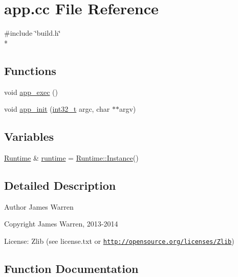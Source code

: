 \section{app.\-cc File Reference}
\label{app_8cc}
{\ttfamily \#include \char`\"{}build.\-h\char`\"{}}\\*
\subsection*{Functions}
\begin{DoxyCompactItemize}
\item 
void \hyperlink{app_8cc_a6259e72a343cd6012e8ceb017bac8556}{app\-\_\-exec} ()
\item 
void \hyperlink{app_8cc_a7ab0624f9c8aeab843f91432c75638ee}{app\-\_\-init} (\hyperlink{stdint_8h_a32f2e37ee053cf2ce8ca28d1f74630e5}{int32\-\_\-t} argc, char $\ast$$\ast$argv)
\end{DoxyCompactItemize}
\subsection*{Variables}
\begin{DoxyCompactItemize}
\item 
\hyperlink{class_runtime}{Runtime} \& \hyperlink{app_8cc_af1705ecc1d279440da4c3de49513a725}{runtime} = \hyperlink{class_runtime_a1146c295df34dff8c1935ec0436edd7d}{Runtime\-::\-Instance}()
\end{DoxyCompactItemize}


\subsection{Detailed Description}
\begin{DoxyAuthor}{Author}
James Warren 
\end{DoxyAuthor}
\begin{DoxyCopyright}{Copyright}
James Warren, 2013-\/2014 
\end{DoxyCopyright}
\begin{DoxyParagraph}{License\-:}
Zlib (see license.\-txt or \href{http://opensource.org/licenses/Zlib}{\tt http\-://opensource.\-org/licenses/\-Zlib}) 
\end{DoxyParagraph}


\subsection{Function Documentation}
